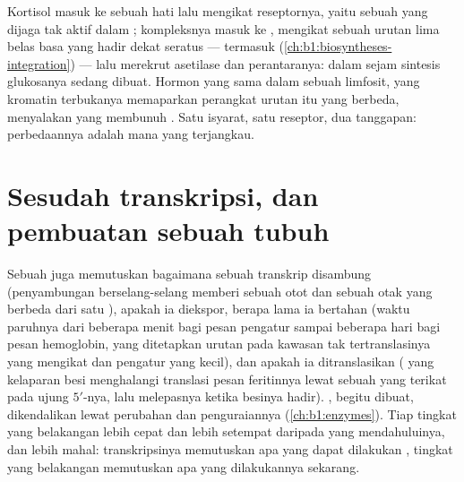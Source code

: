 \begin{example}\label{ex:b1:expression-control:steroid}
Kortisol masuk ke sebuah  hati lalu mengikat reseptornya, yaitu
sebuah  yang dijaga tak aktif dalam ;
kompleksnya masuk ke , mengikat sebuah urutan lima belas basa
yang hadir dekat seratus  ---   termasuk
(\cref{ch:b1:biosyntheses-integration}) --- lalu merekrut asetilase dan
perantaranya: dalam sejam  sintesis glukosanya sedang dibuat.
Hormon yang sama dalam sebuah limfosit, yang kromatin terbukanya
memaparkan perangkat urutan itu yang berbeda, menyalakan  yang
membunuh . Satu isyarat, satu reseptor, dua tanggapan:
perbedaannya adalah  mana yang terjangkau.
\end{example}

\section{Sesudah transkripsi, dan pembuatan sebuah tubuh}

\begin{proposition}\label{prop:b1:expression-control:posttranscriptional}
Sebuah  juga memutuskan bagaimana sebuah transkrip
disambung (penyambungan berselang-selang memberi sebuah otot dan sebuah
otak  yang berbeda dari satu ), apakah ia diekspor, berapa
lama ia bertahan (waktu paruhnya dari beberapa menit bagi pesan 
pengatur sampai beberapa hari bagi pesan hemoglobin, yang ditetapkan
urutan pada kawasan tak tertranslasinya yang mengikat  dan 
pengatur yang kecil), dan apakah ia ditranslasikan ( yang kelaparan
besi menghalangi translasi pesan feritinnya lewat sebuah  yang
terikat pada ujung $5'$-nya, lalu melepasnya ketika besinya hadir).
, begitu dibuat, dikendalikan lewat perubahan dan
penguraiannya (\cref{ch:b1:enzymes}). Tiap tingkat yang belakangan lebih
cepat dan lebih setempat daripada yang mendahuluinya, dan lebih mahal:
transkripsinya memutuskan apa yang dapat dilakukan , tingkat yang
belakangan memutuskan apa yang dilakukannya sekarang.
\end{proposition}

